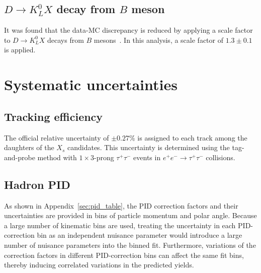 \section{$D\rightarrow K_{L}^{0}X$ decay from $B$ meson}
\label{sec:DtoKLX_correction}
It was found that the data-MC discrepancy is reduced by applying a scale factor to
$D\rightarrow K_{L}^{0}X$ decays from $B$ mesons~\cite{Belle-II:2023esi}.
In this analysis, a scale factor of $1.3\pm0.1$ is applied.

\chapter{Systematic uncertainties}
\label{chap:systematic_uncertainty}
\section{Tracking efficiency}
The official relative uncertainty of $\pm 0.27\%$ is assigned to each track among the daughters of the $X_{s}$ candidates.
This uncertainty is determined using the tag-and-probe method with $1\times3$-prong $\tau^{+}\tau^{-}$ events in $e^{+}e^{-}\rightarrow \tau^{+}\tau^{-}$ collisions.

\section{Hadron PID}
\label{sec:hadron_pid_syst}
As shown in Appendix~\ref{sec:pid_table}, the PID correction factors and their uncertainties are provided in bins of particle momentum and polar angle.
Because a large number of kinematic bins are used, treating the uncertainty in each PID-correction bin as an independent nuisance parameter would introduce a large number of nuisance parameters into the binned fit.
Furthermore, variations of the correction factors in different PID-correction bins can affect the same fit bins, thereby inducing correlated variations in the predicted yields.


